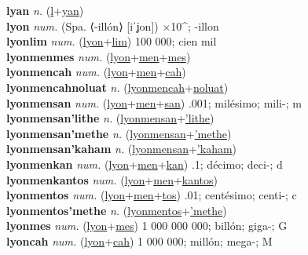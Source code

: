 \textbf{lyan} \textit{n.} (\hyperref[l]{l}+\hyperref[yan]{yan})
 \label{lyan} \\
\textbf{lyon} \textit{num.} (Spa. ⟨-illón⟩ [iˈʝon])
×10\textasciicircum{}; -illon \label{lyon} \\
\textbf{lyonlim} \textit{num.} (\hyperref[lyon]{lyon}+\hyperref[lim]{lim})
100 000; cien mil \label{lyonlim} \\
\textbf{lyonmenmes} \textit{num.} (\hyperref[lyon]{lyon}+\hyperref[men]{men}+\hyperref[mes]{mes})
 \label{lyonmenmes} \\
\textbf{lyonmencah} \textit{num.} (\hyperref[lyon]{lyon}+\hyperref[men]{men}+\hyperref[cah]{cah})
 \label{lyonmencah} \\
\textbf{lyonmencahnoluat} \textit{n.} (\hyperref[lyonmencah]{lyonmencah}+\hyperref[noluat]{noluat})
 \label{lyonmencahnoluat} \\
\textbf{lyonmensan} \textit{num.} (\hyperref[lyon]{lyon}+\hyperref[men]{men}+\hyperref[san]{san})
.001; milésimo; mili-; m \label{lyonmensan} \\
\textbf{lyonmensan'lithe} \textit{n.} (\hyperref[lyonmensan]{lyonmensan}+\hyperref['lithe]{'lithe})
 \label{lyonmensan'lithe} \\
\textbf{lyonmensan'methe} \textit{n.} (\hyperref[lyonmensan]{lyonmensan}+\hyperref['methe]{'methe})
 \label{lyonmensan'methe} \\
\textbf{lyonmensan'kaham} \textit{n.} (\hyperref[lyonmensan]{lyonmensan}+\hyperref['kaham]{'kaham})
 \label{lyonmensan'kaham} \\
\textbf{lyonmenkan} \textit{num.} (\hyperref[lyon]{lyon}+\hyperref[men]{men}+\hyperref[kan]{kan})
.1; décimo; deci-; d \label{lyonmenkan} \\
\textbf{lyonmenkantos} \textit{num.} (\hyperref[lyon]{lyon}+\hyperref[men]{men}+\hyperref[kantos]{kantos})
 \label{lyonmenkantos} \\
\textbf{lyonmentos} \textit{num.} (\hyperref[lyon]{lyon}+\hyperref[men]{men}+\hyperref[tos]{tos})
.01; centésimo; centi-; c \label{lyonmentos} \\
\textbf{lyonmentos'methe} \textit{n.} (\hyperref[lyonmentos]{lyonmentos}+\hyperref['methe]{'methe})
 \label{lyonmentos'methe} \\
\textbf{lyonmes} \textit{num.} (\hyperref[lyon]{lyon}+\hyperref[mes]{mes})
1 000 000 000; billón; giga-; G \label{lyonmes} \\
\textbf{lyoncah} \textit{num.} (\hyperref[lyon]{lyon}+\hyperref[cah]{cah})
1 000 000; millón; mega-; M \label{lyoncah} \\
